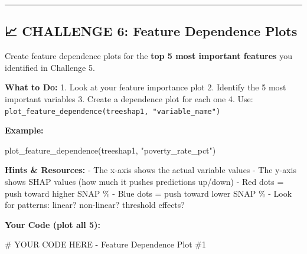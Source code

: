 \documentclass[
  letterpaper,
  DIV=11,
  numbers=noendperiod]{scrartcl}
\newenvironment{Shaded}{\begin{snugshade}}{\end{snugshade}}
\newcommand{\CommentTok}[1]{\textcolor[rgb]{0.37,0.37,0.37}{#1}}
\newcommand{\FunctionTok}[1]{\textcolor[rgb]{0.28,0.35,0.67}{#1}}
\newcommand{\NormalTok}[1]{\textcolor[rgb]{0.00,0.23,0.31}{#1}}
\newcommand{\StringTok}[1]{\textcolor[rgb]{0.13,0.47,0.30}{#1}}
\begin{document}
\begin{center}\rule{0.5\linewidth}{0.5pt}\end{center}

\subsection{📈 CHALLENGE 6: Feature Dependence
Plots}\label{challenge-6-feature-dependence-plots}

\begin{tcolorbox}[enhanced jigsaw, title=\textcolor{quarto-callout-warning-color}{\faExclamationTriangle}\hspace{0.5em}{Your Task}, titlerule=0mm, coltitle=black, colbacktitle=quarto-callout-warning-color!10!white, colback=white, left=2mm, toprule=.15mm, opacitybacktitle=0.6, toptitle=1mm, colframe=quarto-callout-warning-color-frame, bottomtitle=1mm, arc=.35mm, bottomrule=.15mm, breakable, leftrule=.75mm, opacityback=0, rightrule=.15mm]

Create feature dependence plots for the \textbf{top 5 most important
features} you identified in Challenge 5.

\textbf{What to Do:} 1. Look at your feature importance plot 2. Identify
the 5 most important variables 3. Create a dependence plot for each one
4. Use: \texttt{plot\_feature\_dependence(treeshap1,\ "variable\_name")}

\textbf{Example:}

\begin{Shaded}
\begin{Highlighting}[]
\FunctionTok{plot\_feature\_dependence}\NormalTok{(treeshap1, }\StringTok{"poverty\_rate\_pct"}\NormalTok{)}
\end{Highlighting}
\end{Shaded}

\textbf{Hints \& Resources:} - The x-axis shows the actual variable
values - The y-axis shows SHAP values (how much it pushes predictions
up/down) - Red dots = push toward higher SNAP \% - Blue dots = push
toward lower SNAP \% - Look for patterns: linear? non-linear? threshold
effects?

\textbf{Your Code (plot all 5):}

\end{tcolorbox}

\begin{Shaded}
\begin{Highlighting}[]
\CommentTok{\# YOUR CODE HERE {-} Feature Dependence Plot \#1}
\end{Highlighting}
\end{Shaded}
\end{document}
